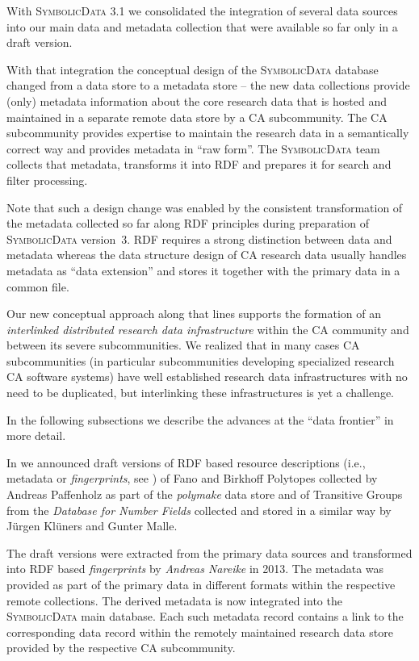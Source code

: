 \documentclass[a4paper,11pt]{article}
\def\SD{\textsc{Symbolic\-Data}}
\begin{document}
\begin{multicols}{2}
\Ueberschrift{Enlarging the {\SD} Database}{esd}

With {\SD} 3.1 we consolidated the integration of several data sources into
our main data and metadata collection that were available so far only in a
draft version.

With that integration the conceptual design of the {\SD} database changed from
a data store to a metadata store -- the new data collections provide (only)
metadata information about the core research data that is hosted and
maintained in a separate remote data store by a CA subcommunity. The CA
subcommunity provides expertise to maintain the research data in a
semantically correct way and provides metadata in ``raw form''.  The {\SD}
team collects that metadata, transforms it into RDF and prepares it for search
and filter processing.

Note that such a design change was enabled by the consistent transformation of
the metadata collected so far along RDF principles during preparation of {\SD}
version~3.  RDF requires a strong distinction between data and metadata
whereas the data structure design of CA research data usually handles metadata
as ``data extension'' and stores it together with the primary data in a common
file.

Our new conceptual approach along that lines supports the formation of an
\emph{interlinked distributed research data infrastructure} within the CA
community and between its severe subcommunities. We realized that in many
cases CA subcommunities (in particular subcommunities developing specialized
research CA software systems) have well established research data
infrastructures with no need to be duplicated, but interlinking these
infrastructures is yet a challenge.

In the following subsections we describe the advances at the ``data frontier''
in more detail.
 

In \cite{cicm-14} we announced draft versions of RDF based resource
descriptions (i.e., metadata or \emph{fingerprints}, see \cite{icms-16}) of
Fano and Birkhoff Polytopes collected by Andreas Paffenholz as part of the
\emph{polymake} data store and of Transitive Groups from the \emph{Database
  for Number Fields} collected and stored in a similar way by J\"urgen
Kl\"uners and Gunter Malle.

The draft versions were extracted from the primary data sources and
transformed into RDF based \emph{fingerprints} by \emph{Andreas Nareike} in
2013.  The metadata was provided as part of the primary data in different
formats within the respective remote collections. The derived metadata is now
integrated into the {\SD} main database. Each such metadata record contains a
link to the corresponding data record within the remotely maintained research
data store provided by the respective CA subcommunity.


\end{multicols}
\end{document}

